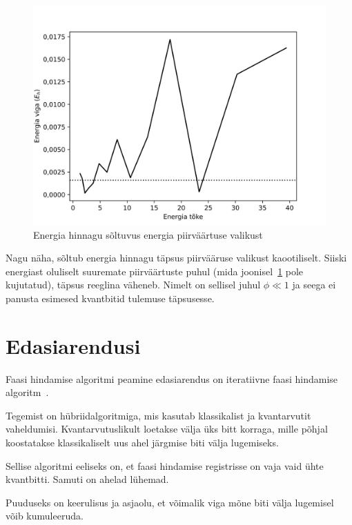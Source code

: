 \documentclass[12pt]{report}
\begin{document}
\begin{figure}[h]
    \centering
    \includegraphics{bounds.jpg}
    \caption{Energia hinnagu sõltuvus energia piirväärtuse valikust}
    \label{fig:bounds}
\end{figure}

Nagu näha, sõltub energia hinnagu täpsus piirvääruse valikust kaootiliselt.
Siiski energiast oluliselt suuremate piirväärtuste puhul (mida joonisel~\ref{fig:bounds} pole kujutatud), täpsus reeglina väheneb.
Nimelt on sellisel juhul \(\phi \ll 1\) ja seega ei panusta esimesed kvantbitid tulemuse täpsusesse.

\section{Edasiarendusi}

Faasi hindamise algoritmi peamine edasiarendus on iteratiivne faasi hindamise algoritm~\cite{mcardle+etal, omalley+etal}.

Tegemist on hübriidalgoritmiga, mis kasutab klassikalist ja kvantarvutit vaheldumisi.
Kvantarvutuslikult loetakse välja üks bitt korraga, mille põhjal koostatakse klassikaliselt uus ahel järgmise biti välja lugemiseks.

Sellise algoritmi eeliseks on, et faasi hindamise registrisse on vaja vaid ühte kvantbitti.
Samuti on ahelad lühemad.

Puuduseks on keerulisus ja asjaolu, et võimalik viga mõne biti välja lugemisel võib kumuleeruda.

\printbibliography[heading=bibintoc, title=Kirjandus]
\end{document}
